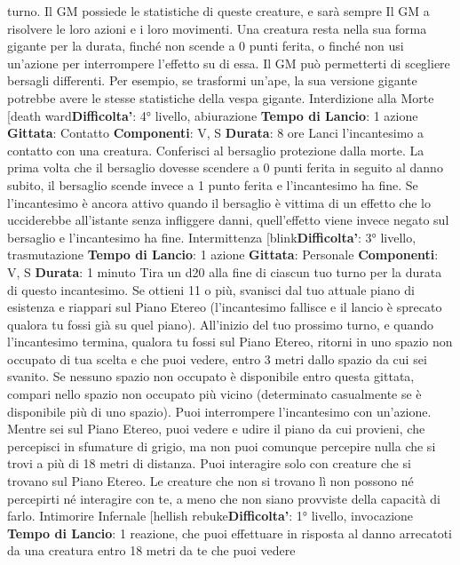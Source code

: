 \begin{multicols}{2}
turno. Il GM possiede le statistiche di queste creature, e
sarà sempre Il GM a risolvere le loro azioni e i loro
movimenti.
Una creatura resta nella sua forma gigante per la
durata, finché non scende a 0 punti ferita, o finché non
usi un’azione per interrompere l’effetto su di essa.
Il GM può permetterti di scegliere bersagli differenti. Per
esempio, se trasformi un’ape, la sua versione gigante
potrebbe avere le stesse statistiche della vespa
gigante.
Interdizione alla Morte
[death ward\textbf{Difficolta'}:
4° livello, abiurazione
\textbf{Tempo di Lancio}: 1 azione
\textbf{Gittata}: Contatto
\textbf{Componenti}: V, S
\textbf{Durata}: 8 ore
Lanci l’incantesimo a contatto con una creatura.
Conferisci al bersaglio protezione dalla morte.
La prima volta che il bersaglio dovesse scendere a 0
punti ferita in seguito al danno subito, il bersaglio
scende invece a 1 punto ferita e l’incantesimo ha fine.
Se l’incantesimo è ancora attivo quando il bersaglio è
vittima di un effetto che lo ucciderebbe all’istante senza
infliggere danni, quell’effetto viene invece negato sul
bersaglio e l’incantesimo ha fine.
Intermittenza
[blink\textbf{Difficolta'}:
3° livello, trasmutazione
\textbf{Tempo di Lancio}: 1 azione
\textbf{Gittata}: Personale
\textbf{Componenti}: V, S
\textbf{Durata}: 1 minuto
Tira un d20 alla fine di ciascun tuo turno per la durata di
questo incantesimo. Se ottieni 11 o più, svanisci dal tuo
attuale piano di esistenza e riappari sul Piano Etereo
(l’incantesimo fallisce e il lancio è sprecato qualora tu
fossi già su quel piano). All’inizio del tuo prossimo
turno, e quando l’incantesimo termina, qualora tu fossi
sul Piano Etereo, ritorni in uno spazio non occupato di
tua scelta e che puoi vedere, entro 3 metri dallo spazio
da cui sei svanito. Se nessuno spazio non occupato è
disponibile entro questa gittata, compari nello spazio
non occupato più vicino (determinato casualmente se è
disponibile più di uno spazio). Puoi interrompere
l’incantesimo con un’azione.
Mentre sei sul Piano Etereo, puoi vedere e udire il
piano da cui provieni, che percepisci in sfumature di
grigio, ma non puoi comunque percepire nulla che si
trovi a più di 18 metri di distanza. Puoi interagire solo
con creature che si trovano sul Piano Etereo. Le
creature che non si trovano lì non possono né percepirti
né interagire con te, a meno che non siano provviste
della capacità di farlo.
Intimorire Infernale
[hellish rebuke\textbf{Difficolta'}:
1° livello, invocazione
\textbf{Tempo di Lancio}: 1 reazione, che puoi effettuare in
risposta al danno arrecatoti da una creatura entro 18
metri da te che puoi vedere

\end{multicols}
